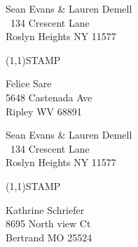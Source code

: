 \documentclass[12pt]{article}
\begin{document}
\begin{minipage}{.5\linewidth} \noindent
Sean Evans \& Lauren Demell\\\ 
134 Crescent Lane\\ 
Roslyn Heights NY 11577
\end{minipage}
\begin{minipage}{.5\linewidth \hspace{-.2in} \vspace{-.3in}}
\begin{flushright}
\framebox(1,1){STAMP}
\end{flushright}
\end{minipage}

\begin{center} \begin{Huge} \vspace*{\fill}
Felice Sare\\
5648 Castenada Ave\\
Ripley WV 68891\\
\vspace{\fill} \end{Huge} \end{center}

\clearpage

\begin{minipage}{.5\linewidth} \noindent
Sean Evans \& Lauren Demell\\\ 
134 Crescent Lane\\ 
Roslyn Heights NY 11577
\end{minipage}
\begin{minipage}{.5\linewidth \hspace{-.2in} \vspace{-.3in}}
\begin{flushright}
\framebox(1,1){STAMP}
\end{flushright}
\end{minipage}

\begin{center} \begin{Huge} \vspace*{\fill}
Kathrine Schriefer\\
8695 North view Ct\\
Bertrand MO 25524\\
\vspace{\fill} \end{Huge} \end{center}

\clearpage
\end{document}
